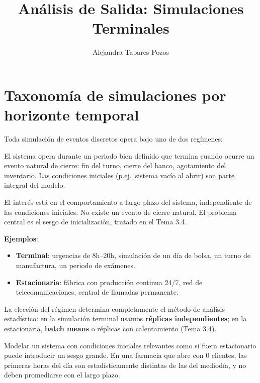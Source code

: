 \documentclass[11pt, letterpaper]{article}
\title{Análisis de Salida: Simulaciones Terminales}
\author{Alejandra Tabares Pozos}
\date{}
\begin{document}
\maketitle
\tableofcontents
\newpage

\section{Taxonomía de simulaciones por horizonte temporal}

Toda simulación de eventos discretos opera bajo uno de dos regímenes:

\begin{definicionbox}
El sistema opera durante un periodo bien definido que termina cuando ocurre un evento natural de cierre: fin del turno, cierre del banco, agotamiento del inventario. Las condiciones iniciales (p.ej.\ sistema vacío al abrir) son parte integral del modelo.
\end{definicionbox}

\begin{definicionbox}
El interés está en el comportamiento a largo plazo del sistema, independiente de las condiciones iniciales. No existe un evento de cierre natural. El problema central es el sesgo de inicialización, tratado en el Tema 3.4.
\end{definicionbox}

\textbf{Ejemplos}:
\begin{itemize}
    \item \textbf{Terminal}: urgencias de 8h--20h, simulación de un día de bolsa, un turno de manufactura, un periodo de exámenes.
    \item \textbf{Estacionaria}: fábrica con producción continua 24/7, red de telecomunicaciones, central de llamadas permanente.
\end{itemize}

La elección del régimen determina completamente el método de análisis estadístico: en la simulación terminal usamos \textbf{réplicas independientes}; en la estacionaria, \textbf{batch means} o réplicas con calentamiento (Tema 3.4).

\begin{alertabox}
Modelar un sistema con condiciones iniciales relevantes como si fuera estacionario puede introducir un sesgo grande. En una farmacia que abre con 0 clientes, las primeras horas del día son estadísticamente distintas de las del mediodía, y no deben promediarse con el largo plazo.
\end{alertabox}
\end{document}
